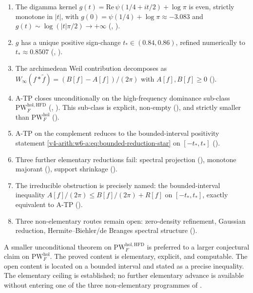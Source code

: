 \begin{enumerate}
\item The digamma kernel \(g(t)=\mathrm{Re}\,\psi(1/4+it/2)+\log\pi\)
is even, strictly monotone in \(|t|\), with
\(g(0)=\psi(1/4)+\log\pi\approx-3.083\) and
\(g(t)\sim\log(|t|\pi/2)\to+\infty\)
(,
).
\item \(g\) has a unique positive sign-change
\(t_{\ast}\in(0.84,0.86)\), refined numerically to
\(t_{\ast}\approx 0.8507\)
(,
).
\item The archimedean Weil contribution decomposes as
\(W_{\infty}(f*\widetilde{f})=(B[f]-A[f])/(2\pi)\) with \(A[f],B[f]\geq 0\)
().
\item A-TP closes unconditionally on the high-frequency dominance
sub-class \(\mathrm{PW}^{\mathrm{hol},\mathrm{HFD}}_{F}\)
(,
). This sub-class is explicit,
non-empty (), and strictly
smaller than \(\mathrm{PW}^{\mathrm{hol}}_{F}\)
().
\item A-TP on the complement reduces to the bounded-interval
positivity statement \eqref{v4-arith:w6-a:eq:bounded-reduction-star}
on \([-t_{\ast},t_{\ast}]\)
().
\item Three further elementary reductions fail: spectral
projection (), monotone
majorant (), support
shrinkage ().
\item The irreducible obstruction is precisely named: the
bounded-interval inequality \(A[f]/(2\pi)\leq B[f]/(2\pi)+R[f]\) on
\([-t_{\ast},t_{\ast}]\), exactly equivalent to A-TP
().
\item Three non-elementary routes remain open: zero-density
refinement, Gaussian reduction, Hermite--Biehler/de Branges
spectral structure ().
\end{enumerate}

\begin{remark}
\label{v4-arith:w6-a:rem:beilinson-closing}
A smaller unconditional theorem on
\(\mathrm{PW}^{\mathrm{hol},\mathrm{HFD}}_{F}\) is preferred to a
larger conjectural claim on \(\mathrm{PW}^{\mathrm{hol}}_{F}\). The
proved content is elementary, explicit, and computable. The open
content is located on a bounded interval and stated as a precise
inequality. The elementary ceiling is established; no further
elementary advance is available without entering one of the three
non-elementary programmes of .
\end{remark}
